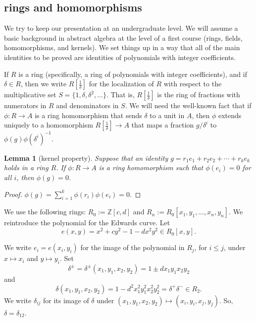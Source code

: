 \documentclass[18pt]{article}
\newtheorem{lemma}[theorem]{Lemma}
\newcommand{\ring}[1]{\mathbb{#1}}
\newcommand{\f}[1]{\frac{1}{#1}}
\begin{document}
\subsection{rings and homomorphisms}

We try to keep our presentation at an undergraduate level.
We will assume a basic background in abstract algebra at the level of a first course (rings, fields, homomorphisms, and kernels).
We set things up in a way that all of the main identities to be proved are identities of polynomials with integer coefficients.

If $R$ is a ring (specifically, a ring of polynomials with integer coefficients), and if $\delta\in R$, then we write
$R[\f{\delta}]$ for the localization of $R$ with respect to the multiplicative set $S=\{1,\delta,\delta^2,\ldots\}$.  That is,
$R[\f{\delta}]$ is the ring of fractions with numerators in $R$ and denominators in $S$.  We will need the 
well-known fact that if $\phi:R\to A$
is a ring homomorphism that sends $\delta$ to a unit in $A$, then $\phi$ extends uniquely to a homomorphism
$R[\f{\delta}]\to A$ that maps a fraction $g/\delta^i$ to $\phi(g)\phi(\delta^i)^{-1}$.

\begin{lemma}[kernel property] Suppose that an identity $g = r_1 e_1 +
  r_2 e_2 +\cdots + r_k e_k$ holds in a ring $R$.  If $\phi:R\to A$ is
  a ring homomorphism such that $\phi(e_i) =0$ for all $i$, then
  $\phi(g)=0$.
\end{lemma}

\begin{proof}
$\phi(g) = \sum_{i=1}^k \phi(r_i) \phi(e_i) = 0.$
\end{proof}

We use the following rings: $R_0 := \ring{Z}[c,d]$ and $R_n :=
R_0[x_1,y_1,\ldots,x_n,y_n]$.  We reintroduce the polynomial for the
Edwards curve.  Let
\begin{equation}
e(x,y) = x^2 + c y^2 -1 - d x^2 y^2 \in  R_0[x,y].
\end{equation}



We write $e_i = e(x_i,y_i)$ for the image of the polynomial in $R_j$, for $i\le j$, under $x\mapsto x_i$ and $y\mapsto y_i$.
Set
\[\delta^\pm=\delta^{\pm} (x_1,y_1,x_2,y_2) = 1\pm d x_1 y_1 x_2 y_2\] and
\[
\delta(x_1,y_1,x_2,y_2) = 1 - d^2 x_1^2 y_1^2 x_2^2 y_2^2 =\delta^+\delta^-\in R_2.
\]
We write $\delta_{ij}$ for its image of $\delta$ under $(x_1,y_1,x_2,y_2)\mapsto (x_i,y_i,x_j,y_j)$.  So, $\delta=\delta_{12}$.
\end{document}
